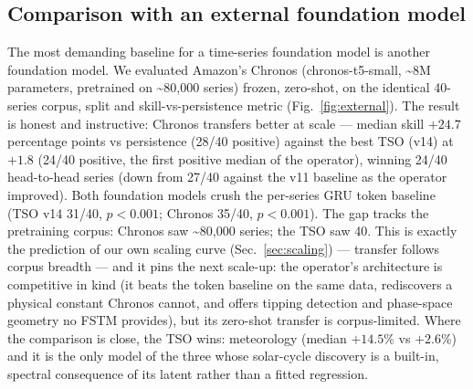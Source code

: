 \documentclass[11pt]{article}
\begin{document}
\subsection{Comparison with an external foundation model}
\label{sec:external}
The most demanding baseline for a time-series foundation model is another
foundation model. We evaluated Amazon's Chronos (chronos-t5-small,
\textasciitilde 8M parameters, pretrained on \textasciitilde 80{,}000 series)
frozen, zero-shot, on the identical 40-series corpus, split and
skill-vs-persistence metric (Fig.~\ref{fig:external}). The result is honest
and instructive: Chronos transfers better at scale --- median skill $+24.7$
percentage points vs persistence (28/40 positive) against the best TSO
(v14) at $+1.8$ (24/40 positive, the first positive median of the
operator), winning 24/40 head-to-head series (down from 27/40 against
the v11 baseline as the operator improved). Both foundation models crush
the per-series GRU token baseline (TSO v14 31/40, $p<0.001$; Chronos 35/40,
$p<0.001$). The gap tracks the pretraining corpus: Chronos saw
\textasciitilde 80{,}000 series; the TSO saw 40. This is exactly the
prediction of our own scaling curve (Sec.~\ref{sec:scaling}) --- transfer
follows corpus breadth --- and it pins the next scale-up: the operator's
architecture is competitive in kind (it beats the token baseline on the
same data, rediscovers a physical constant Chronos cannot, and offers
tipping detection and phase-space geometry no FSTM provides), but its
zero-shot transfer is corpus-limited. Where the comparison is close, the
TSO wins: meteorology (median $+14.5$\% vs $+2.6$\%) and it is the only
model of the three whose solar-cycle discovery is a built-in, spectral
consequence of its latent rather than a fitted regression.
\end{document}
